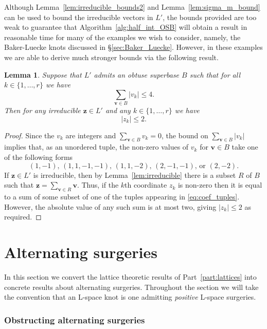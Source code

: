 \documentclass{amsart} %
\newcommand{\bv}{\bm{v}}
\theoremstyle{thm}
\newtheorem{lem}[Theorem]{Lemma}
\theoremstyle{definition}
\numberwithin{equation}{section}
\begin{document}
Although Lemma~\ref{lem:irreducible_bounds2} and Lemma~\ref{lem:sigma_m_bound} can be used to bound the irreducible vectors in $L'$, the bounds provided are too weak to guarantee that Algorithm~\ref{alg:half_int_OSB} will obtain a result in reasonable time for many of the examples we wish to consider, namely, the Baker-Luecke knots discussed in \S\ref{sec:Baker_Luecke}. However, in these examples we are able to derive much stronger bounds via the following result.
\begin{lem}\label{lem:half_int_coef_bound}
    Suppose that $L'$ admits an obtuse superbase $B$ such that for all $k\in \{1, \dots, r\}$ we have
    \[
    \sum_{\bv\in B} |v_k|\leq 4.
    \]
    Then for any irreducible $\bm{z}\in L'$ and any $k\in \{1, \dots, r\}$ we have
    \[
    |z_k|\leq 2.
    \]
\end{lem}
\begin{proof}
    Since the $v_k$ are integers and $\sum_{\bv \in B}v_k=0$, the bound on $\sum_{\bv\in B} |v_k|$ implies that, as an unordered tuple, the non-zero values of $v_k$ for $\bv\in B$ take one of the following forms
    \begin{equation}\label{eq:coef_tuples}
    \text{$(1,-1)$, $(1,1,-1,-1)$, $(1,1,-2)$, $(2,-1,-1)$, or $(2,-2)$.}
    \end{equation}
    If $\bm{z}\in L'$ is irreducible, then by Lemma~\ref{lem:irreducible} there is a subset $R$ of $B$ such that $\bm{z}=\sum_{\bv\in R}\bv$. Thus, if the $k$th coordinate $z_k$ is non-zero then it is equal to a sum of some subset of one of the tuples appearing in \eqref{eq:coef_tuples}. However, the absolute value of any such sum is at most two, giving $|z_k|\leq 2$ as required. 
\end{proof}

\part{Alternating surgeries}\label{part:alternating}
In this section we convert the lattice theoretic results of Part~\ref{part:lattices} into concrete results about alternating surgeries. Throughout the section we will take the convention that an L-space knot is one admitting \emph{positive} L-space surgeries.
\section{Obstructing alternating surgeries}\label{sec:sharp}
\end{document}
